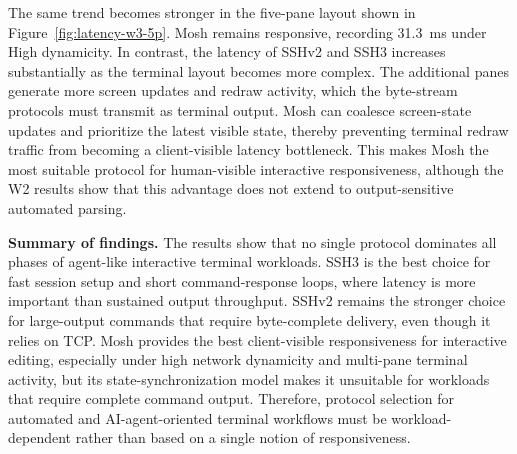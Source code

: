 The same trend becomes stronger in the five-pane layout shown in
Figure~\ref{fig:latency-w3-5p}. Mosh remains responsive, recording
31.3~ms under High dynamicity. In contrast, the latency of SSHv2 and SSH3
increases substantially as the terminal layout becomes more complex. The
additional panes generate more screen updates and redraw activity, which
the byte-stream protocols must transmit as terminal output. Mosh can
coalesce screen-state updates and prioritize the latest visible state,
thereby preventing terminal redraw traffic from becoming a client-visible
latency bottleneck. This makes Mosh the most suitable protocol for
human-visible interactive responsiveness, although the W2 results show that
this advantage does not extend to output-sensitive automated parsing.

\textbf{Summary of findings.}
The results show that no single protocol dominates all phases of
agent-like interactive terminal workloads. SSH3 is the best choice for
fast session setup and short command-response loops, where latency is more
important than sustained output throughput. SSHv2 remains the stronger
choice for large-output commands that require byte-complete delivery, even
though it relies on TCP. Mosh provides the best client-visible responsiveness
for interactive editing, especially under high network dynamicity and
multi-pane terminal activity, but its state-synchronization model makes it
unsuitable for workloads that require complete command output. Therefore,
protocol selection for automated and AI-agent-oriented terminal workflows
must be workload-dependent rather than based on a single notion of
responsiveness.
